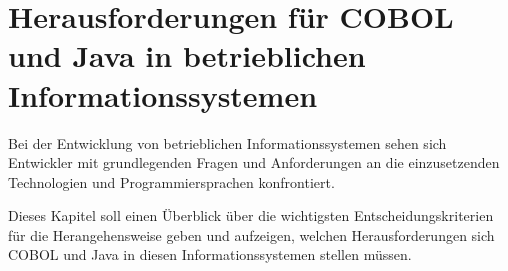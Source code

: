 \chapter{Herausforderungen für COBOL und Java in betrieblichen Informationssystemen}
Bei der Entwicklung von betrieblichen Informationssystemen sehen sich Entwickler mit grundlegenden Fragen und Anforderungen an die einzusetzenden Technologien und Programmiersprachen konfrontiert.

Dieses Kapitel soll einen Überblick über die wichtigsten Entscheidungskriterien für die Herangehensweise geben und aufzeigen, welchen Herausforderungen sich COBOL und Java in diesen Informationssystemen stellen müssen.

\label{ch:herausforderungen}
    
    
    
    
    
    